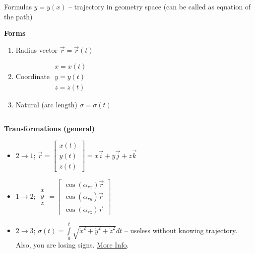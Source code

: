 \documentclass[aspectratio=169,xcolor=table,10pt, notes=hide]{beamer}
\begin{document}
\begin{frame}[t]{Formulas}
    \footnotesize
    $y = y(x)$ -- trajectory in geometry space (can be called as equation of the path)

    \centering\textbf{Forms}
    \vspace{-0.3cm}
    \begin{multicols}{3}
        \begin{enumerate}
            \footnotesize
            \item Radius vector $\vec{r} = \vec{r}(t)$
            \item Coordinate $\begin{matrix} x = x(t)\\y = y(t)\\z = z(t)\end{matrix}$
            \item Natural (arc length) $\sigma = \sigma(t)$
        \end{enumerate}
    \end{multicols}
    \vspace{-0.3cm}
    \begin{columns}[T,onlytextwidth]
        \begin{column}{0.42\textwidth}
            \textbf{Transformations (general)}
            \begin{itemize}
                \footnotesize
                \item $2 \rightarrow 1$; $\vec{r} = \begin{bmatrix}x(t)\\y(t)\\z(t)\end{bmatrix} = x\vec{i} + y\vec{j} + z\vec{k}$
                \item $1 \rightarrow 2$; $\begin{matrix} x\\ y\\ z \end{matrix} = \begin{bmatrix}
                              \cos(\alpha_{rx})\vec{r} \\
                              \cos(\alpha_{ry})\vec{r} \\
                              \cos(\alpha_{rz})\vec{r}
                          \end{bmatrix}$
                \item $2 \rightarrow 3$; $\sigma(t)=\int \limits _{0}^{t}{\sqrt {\dot{x}^2 + \dot{y}^2 + \dot{z}^2}}dt$ -- useless without knowing trajectory. Also, you are losing signs. \href{https://youtu.be/Hfn0Oj\_METo?si=omTZDwwpof7N9uwd}{More Info}.
            \end{itemize}


\end{column}
\end{columns}
\end{frame}
\end{document}

